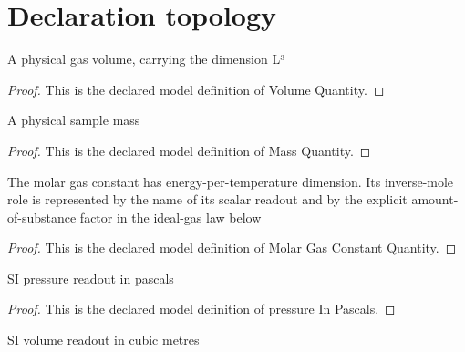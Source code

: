 \section{Declaration topology}
\begin{definition}
  \label{def:physics:phyx-mini-0373:phyxminiproblems-problemphyxmini0373-volumequantity}
  A physical gas volume, carrying the dimension L³
\end{definition}
\begin{proof}
  This is the declared model definition of Volume Quantity.
\end{proof}
\begin{definition}
  \label{def:physics:phyx-mini-0373:phyxminiproblems-problemphyxmini0373-massquantity}
  A physical sample mass
\end{definition}
\begin{proof}
  This is the declared model definition of Mass Quantity.
\end{proof}
\begin{definition}
  \label{def:physics:phyx-mini-0373:phyxminiproblems-problemphyxmini0373-molargasconstantquantity}
  The molar gas constant has energy-per-temperature dimension. Its inverse-mole role is represented by the name of its scalar readout and by the explicit amount-of-substance factor in the ideal-gas law below
\end{definition}
\begin{proof}
  This is the declared model definition of Molar Gas Constant Quantity.
\end{proof}
\begin{definition}
  \label{def:physics:phyx-mini-0373:phyxminiproblems-problemphyxmini0373-pressureinpascals}
  SI pressure readout in pascals
\end{definition}
\begin{proof}
  This is the declared model definition of pressure In Pascals.
\end{proof}
\begin{definition}
  \label{def:physics:phyx-mini-0373:phyxminiproblems-problemphyxmini0373-volumeincubicmeters}
  SI volume readout in cubic metres
\end{definition}

